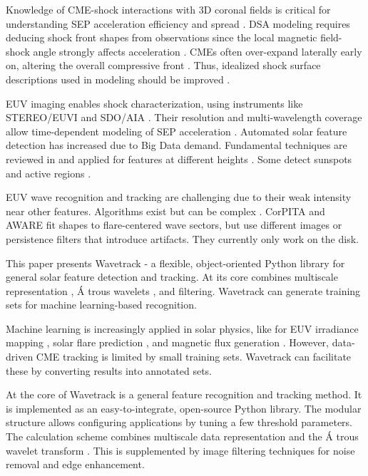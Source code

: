 Knowledge of CME-shock interactions with 3D coronal fields is critical for understanding SEP acceleration efficiency and spread \cite{rouillard_2016}. DSA modeling requires deducing shock front shapes from observations since the local magnetic field-shock angle strongly affects acceleration \cite{guo_2013}. CMEs often over-expand laterally early on, altering the overall compressive front \cite{bein_2011, temmer_2016}. Thus, idealized shock surface descriptions used in modeling should be improved \citep{vourlidas_2012, kwon_2014, rouillard_2016}.

EUV imaging enables shock characterization, using instruments like STEREO/EUVI \citep{wuelser_2004} and SDO/AIA \citep{lemen_2012}. Their resolution and multi-wavelength coverage allow time-dependent modeling of SEP acceleration \citep{kozarev_2016, kozarev_2017, kozarev_2019}. Automated solar feature detection has increased due to Big Data demand. Fundamental techniques are reviewed in \citet{aschwanden_2010} and applied for features at different heights \citep{perez_Suarez_2011}. Some detect sunspots and active regions \citep{curto_2008}.

EUV wave recognition and tracking are challenging due to their weak intensity near other features. Algorithms exist but can be complex \citep{podladchikova_2005, verbeeck_2014, long_2014, ireland_2019}. CorPITA \citep{long_2014} and AWARE \citep{ireland_2019} fit shapes to flare-centered wave sectors, but use different images or persistence filters that introduce artifacts. They currently only work on the disk. 

This paper presents Wavetrack - a flexible, object-oriented Python library for general solar feature detection and tracking. At its core combines multiscale representation \citep{starck_2002}, \'A trous wavelets \citep{akansu_1991, holschneider_1989}, and filtering. Wavetrack can generate training sets for machine learning-based recognition.

Machine learning is increasingly applied in solar physics, like for EUV irradiance mapping \citep{szenicer_2019}, solar flare prediction \citep{li_2013}, and magnetic flux generation \citep{kim_2019}. However, data-driven CME tracking is limited by small training sets. Wavetrack can facilitate these by converting results into annotated sets.

At the core of Wavetrack is a general feature recognition and tracking method. It is implemented as an easy-to-integrate, open-source Python library. The modular structure allows configuring applications by tuning a few threshold parameters. The calculation scheme combines multiscale data representation \citep{starck_2002} and the \'A trous wavelet transform \citep{akansu_1991, holschneider_1989}. This is supplemented by image filtering techniques for noise removal and edge enhancement.

